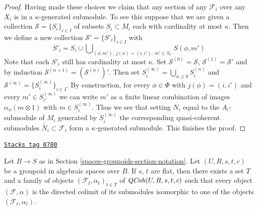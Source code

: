 \begin{proof}
\medskip\noindent
Having made these choices we claim that any section of any $\mathcal{F}_i$
over any $X_i$ is in a $\kappa$-generated submodule. To see this suppose
that we are given a collection $\mathcal{S} = \{S_i\}_{i \in I}$ of subsets
$S_i \subset M_i$ each with cardinality at most $\kappa$. Then we define
a new collection $\mathcal{S}' = \{S'_i\}_{i \in I}$ with
$$
S'_i = S_i \cup
\bigcup\nolimits_{(\phi, m'),\ j(\phi) = (i, i'),\ m' \in S_{i'}} S(\phi, m')
$$
Note that each $S'_i$ still has cardinality at most $\kappa$.
Set $\mathcal{S}^{(0)} = \mathcal{S}$,
$\mathcal{S}^{(1)} = \mathcal{S}'$ and by induction
$\mathcal{S}^{(n + 1)} = (\mathcal{S}^{(n)})'$. Then set
$S_i^{(\infty)} = \bigcup_{n \geq 0} S_i^{(n)}$ and
$\mathcal{S}^{(\infty)} = \{S_i^{(\infty)}\}_{i \in I}$.
By construction, for every $\phi \in \Phi$ with $j(\phi) = (i, i')$
and every $m' \in S^{(\infty)}_{i'}$ we can write $m'$
as a finite linear combination of images $\alpha_\phi(m \otimes 1)$
with $m \in S_i^{(\infty)}$. Thus we see that setting $N_i$ equal
to the $A_i$-submodule of $M_i$ generated by $S_i^{(\infty)}$
the corresponding quasi-coherent submodules
$\widetilde{N_i} \subset \mathcal{F}_i$ form a $\kappa$-generated submodule.
This finishes the proof.
\end{proof}

\begin{lemma}
\label{spaces-groupoids-lemma-set-generators}
\href{https://stacks.math.columbia.edu/tag/0780}{\texttt{Stacks tag 0780}}

Let $B \to S$ as in Section \ref{spaces-groupoids-section-notation}.
Let $(U, R, s, t, c)$ be a groupoid in algebraic spaces over $B$.
If $s$, $t$ are flat, then there exists a set $T$ and a family of objects
$(\mathcal{F}_t, \alpha_t)_{t \in T}$ of $\mathit{QCoh}(U, R, s, t, c)$
such that every object $(\mathcal{F}, \alpha)$ is the directed colimit
of its submodules isomorphic to one of the objects $(\mathcal{F}_t, \alpha_t)$.
\end{lemma}

